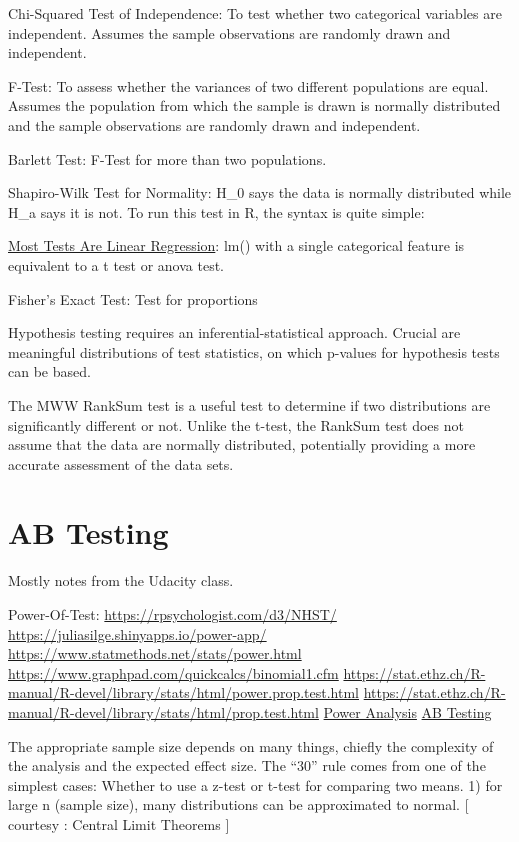 \documentclass[]{book}
\begin{document}
Chi-Squared Test of Independence: To test whether two categorical variables are independent. Assumes the sample observations are randomly drawn and independent.

F-Test: To assess whether the variances of two different populations are equal. Assumes the population from which the sample is drawn is normally distributed and the sample observations are randomly drawn and independent.

Barlett Test: F-Test for more than two populations.

Shapiro-Wilk Test for Normality: H\_0 says the data is normally distributed while H\_a says it is not. To run this test in R, the syntax is quite simple:

\href{https://lindeloev.github.io/tests-as-linear/}{Most Tests Are Linear Regression}: lm() with a single categorical feature is equivalent to a t test or anova test.

Fisher's Exact Test: Test for proportions

Hypothesis testing requires an inferential-statistical approach. Crucial are meaningful distributions of test statistics, on which p-values for hypothesis tests can be based.

The MWW RankSum test is a useful test to determine if two distributions are significantly different or not. Unlike the t-test, the RankSum test does not assume that the data are normally distributed, potentially providing a more accurate assessment of the data sets.

\hypertarget{ab-testing}{%
\section{AB Testing}\label{ab-testing}}

Mostly notes from the Udacity class.

Power-Of-Test: \url{https://rpsychologist.com/d3/NHST/} \url{https://juliasilge.shinyapps.io/power-app/} \url{https://www.statmethods.net/stats/power.html} \url{https://www.graphpad.com/quickcalcs/binomial1.cfm} \url{https://stat.ethz.ch/R-manual/R-devel/library/stats/html/power.prop.test.html} \url{https://stat.ethz.ch/R-manual/R-devel/library/stats/html/prop.test.html} \href{https://www.statmethods.net/stats/power.html}{Power Analysis} \href{http://www.evanmiller.org/announcing-evans-awesome-ab-tools.html}{AB Testing}

The appropriate sample size depends on many things, chiefly the complexity of the analysis and the expected effect size. The ``30'' rule comes from one of the simplest cases: Whether to use a z-test or t-test for comparing two means.
1) for large n (sample size), many distributions can be approximated to normal. {[} courtesy : Central Limit Theorems {]}
\end{document}

